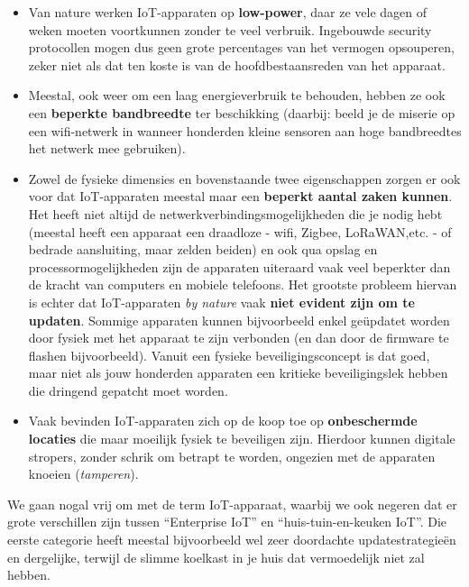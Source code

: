 \documentclass[
  10pt,
  dutch,
  paper=a4,
  ,captions=tableheading
]{scrbook}
\providecommand{\tightlist}{%
  \setlength{\itemsep}{0pt}\setlength{\parskip}{0pt}}
\begin{document}
\begin{itemize}
\tightlist
\item
  Van nature werken IoT-apparaten op \textbf{low-power}, daar ze vele
  dagen of weken moeten voortkunnen zonder te veel verbruik. Ingebouwde
  security protocollen mogen dus geen grote percentages van het vermogen
  opsouperen, zeker niet als dat ten koste is van de hoofdbestaansreden
  van het apparaat.
\item
  Meestal, ook weer om een laag energieverbruik te behouden, hebben ze
  ook een \textbf{beperkte bandbreedte} ter beschikking (daarbij: beeld
  je de miserie op een wifi-netwerk in wanneer honderden kleine sensoren
  aan hoge bandbreedtes het netwerk mee gebruiken).
\item
  Zowel de fysieke dimensies en bovenstaande twee eigenschappen zorgen
  er ook voor dat IoT-apparaten meestal maar een \textbf{beperkt aantal
  zaken kunnen}. Het heeft niet altijd de
  netwerkverbindingsmogelijkheden die je nodig hebt (meestal heeft een
  apparaat een draadloze - wifi, Zigbee, LoRaWAN,etc. - of bedrade
  aansluiting, maar zelden beiden) en ook qua opslag en
  processormogelijkheden zijn de apparaten uiteraard vaak veel beperkter
  dan de kracht van computers en mobiele telefoons. Het grootste
  probleem hiervan is echter dat IoT-apparaten \emph{by nature} vaak
  \textbf{niet evident zijn om te updaten}. Sommige apparaten kunnen
  bijvoorbeeld enkel geüpdatet worden door fysiek met het apparaat te
  zijn verbonden (en dan door de firmware te flashen bijvoorbeeld).
  Vanuit een fysieke beveiligingsconcept is dat goed, maar niet als jouw
  honderden apparaten een kritieke beveiligingslek hebben die dringend
  gepatcht moet worden.
\item
  Vaak bevinden IoT-apparaten zich op de koop toe op
  \textbf{onbeschermde locaties} die maar moeilijk fysiek te beveiligen
  zijn. Hierdoor kunnen digitale stropers, zonder schrik om betrapt te
  worden, ongezien met de apparaten knoeien (\emph{tamperen}).
\end{itemize}

\begin{noteblock}
We gaan nogal vrij om met de term IoT-apparaat, waarbij we ook negeren
dat er grote verschillen zijn tussen ``Enterprise IoT'' en
``huis-tuin-en-keuken IoT''. Die eerste categorie heeft meestal
bijvoorbeeld wel zeer doordachte updatestrategieën en dergelijke,
terwijl de slimme koelkast in je huis dat vermoedelijk niet zal hebben.
\end{noteblock}
\end{document}
